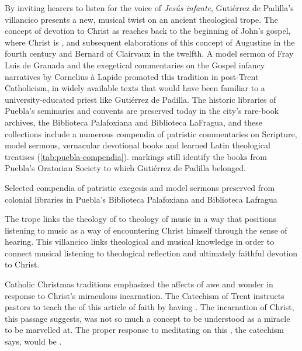 By inviting hearers to listen for the voice of \emph{Jesús infante}, Gutiérrez
de Padilla's villancico presents a new, musical twist on an ancient theological
trope.
The concept of devotion to Christ as  reaches back to
the beginning of John's gospel, where Christ is ,
and subsequent elaborations of this concept of Augustine in the fourth century
and Bernard of Clairvaux in the twelfth.
A model sermon of Fray Luis de Granada and the exegetical commentaries on the
Gospel infancy narratives by Cornelius à Lapide promoted this tradition in
post-Trent Catholicism, in widely available texts that would have been familiar
to a university-educated priest like Gutiérrez de Padilla.
The historic libraries of Puebla's seminaries and convents are preserved today
in the city's rare-book archives, the Biblioteca Palafoxiana and Biblioteca
LaFragua, and these collections include a numerous compendia of patristic
commentaries on Scripture, model sermons, vernacular devotional books and
learned Latin theological treatises (\cref{tab:puebla-compendia}).
 markings still identify the books from Puebla's 
Oratorian Society to which Gutiérrez de Padilla belonged.%
    \Autocite{Mauleon:PadillaCivil}

{Selected compendia of patristic exegesis and model sermons preserved from
colonial libraries in Puebla's Biblioteca Palafoxiana and Biblioteca Lafragua}

The  trope links the theology of  to
theology of music in a way that positions listening to music as a way of
encountering Christ himself through the sense of hearing.
This villancico links theological and musical knowledge in order to connect
musical listening to theological reflection and ultimately faithful devotion
to Christ.

Catholic Christmas traditions emphasized the affects of awe and wonder in
response to Christ's miraculous incarnation.
The Catechism of Trent instructs pastors to teach the 
of this article of faith by having .%
    \Autocite[50]{Catholic:Catechismus1614}
The incarnation of Christ, this passage suggests, was not so much a concept to
be understood as a miracle to be marvelled at.
The proper response to meditating on this , the
catechism says, would be .%
    \Autocite[50]{Catholic:Catechismus1614}

